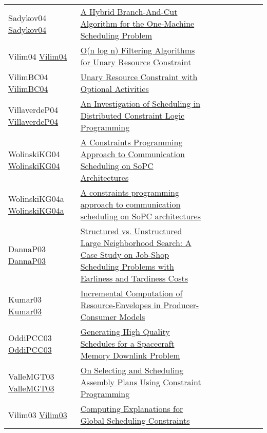 {\begin{longtable}{p{3cm}p{7cm}lllllll}
Sadykov04 \href{https://doi.org/10.1007/978-3-540-24664-0\_31}{Sadykov04} &  \href{papers/Sadykov04.pdf}{A Hybrid Branch-And-Cut Algorithm for the One-Machine Scheduling Problem} &  &  &  &  &  &  & \\
Vilim04 \href{https://doi.org/10.1007/978-3-540-24664-0\_23}{Vilim04} &  \href{papers/Vilim04.pdf}{O(n log n) Filtering Algorithms for Unary Resource Constraint} &  &  &  &  &  &  & \\
VilimBC04 \href{https://doi.org/10.1007/978-3-540-30201-8\_8}{VilimBC04} &  \href{papers/VilimBC04.pdf}{Unary Resource Constraint with Optional Activities} &  &  &  &  &  &  & \\
VillaverdeP04 \href{}{VillaverdeP04} &  \href{papers/VillaverdeP04.pdf}{An Investigation of Scheduling in Distributed Constraint Logic Programming} &  &  &  &  &  &  & \\
WolinskiKG04 \href{https://doi.org/10.1109/DSD.2004.1333291}{WolinskiKG04} &  \href{papers/WolinskiKG04.pdf}{A Constraints Programming Approach to Communication Scheduling on SoPC Architectures} &  &  &  &  &  &  & \\
WolinskiKG04a \href{https://doi.org/10.1145/968280.968336}{WolinskiKG04a} &  \href{papers/WolinskiKG04a.pdf}{A constraints programming approach to communication scheduling on SoPC architectures} &  &  &  &  &  &  & \\
DannaP03 \href{https://doi.org/10.1007/978-3-540-45193-8\_59}{DannaP03} &  \href{papers/DannaP03.pdf}{Structured vs. Unstructured Large Neighborhood Search: {A} Case Study on Job-Shop Scheduling Problems with Earliness and Tardiness Costs} &  &  &  &  &  &  & \\
Kumar03 \href{https://doi.org/10.1007/978-3-540-45193-8\_45}{Kumar03} &  \href{papers/Kumar03.pdf}{Incremental Computation of Resource-Envelopes in Producer-Consumer Models} &  &  &  &  &  &  & \\
OddiPCC03 \href{https://doi.org/10.1007/978-3-540-45193-8\_39}{OddiPCC03} &  \href{papers/OddiPCC03.pdf}{Generating High Quality Schedules for a Spacecraft Memory Downlink Problem} &  &  &  &  &  &  & \\
ValleMGT03 \href{https://doi.org/10.1007/978-3-540-45226-3\_180}{ValleMGT03} &  \href{papers/ValleMGT03.pdf}{On Selecting and Scheduling Assembly Plans Using Constraint Programming} &  &  &  &  &  &  & \\
Vilim03 \href{https://doi.org/10.1007/978-3-540-45193-8\_124}{Vilim03} &  \href{papers/Vilim03.pdf}{Computing Explanations for Global Scheduling Constraints} &  &  &  &  &  &  & \\

\end{longtable}}
